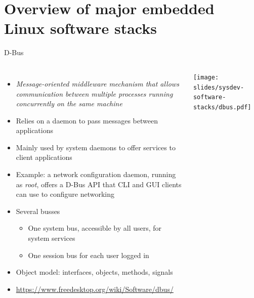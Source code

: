 \section{Overview of major embedded Linux software stacks}

\begin{frame}{D-Bus}
  \begin{columns}
    \begin{itemize}
    \item {\em Message-oriented middleware mechanism that allows
        communication between multiple processes running concurrently on
        the same machine}
    \item Relies on a daemon to pass messages between applications
    \item Mainly used by system daemons to offer services to client
      applications
    \item Example: a network configuration daemon, running as {\em
        root}, offers a D-Bus API that CLI and GUI clients can use to
      configure networking
    \item Several busses
      \begin{itemize}
      \item One system bus, accessible by all users, for system services
      \item One session bus for each user logged in
      \end{itemize}
    \item Object model: interfaces, objects, methods, signals
    \item \url{https://www.freedesktop.org/wiki/Software/dbus/}
    \end{itemize}
    \texttt{[image: slides/sysdev-software-stacks/dbus.pdf]}
  \end{columns}
\end{frame}

